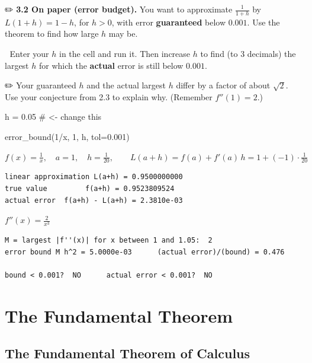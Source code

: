 \documentclass[
  letterpaper,
  DIV=11,
  numbers=noendperiod]{scrreprt}
\newenvironment{Shaded}{\begin{snugshade}}{\end{snugshade}}
\newcommand{\CommentTok}[1]{\textcolor[rgb]{0.37,0.37,0.37}{#1}}
\newcommand{\DecValTok}[1]{\textcolor[rgb]{0.68,0.00,0.00}{#1}}
\newcommand{\FloatTok}[1]{\textcolor[rgb]{0.68,0.00,0.00}{#1}}
\newcommand{\NormalTok}[1]{\textcolor[rgb]{0.00,0.23,0.31}{#1}}
\newcommand{\OperatorTok}[1]{\textcolor[rgb]{0.37,0.37,0.37}{#1}}
\theoremstyle{plain}
\theoremstyle{plain}
\theoremstyle{definition}
\theoremstyle{definition}
\theoremstyle{definition}
\theoremstyle{plain}
\theoremstyle{plain}
\theoremstyle{remark}
\begin{document}
✏️ \textbf{3.2 On paper (error budget).} You want to approximate
\(\frac{1}{1+h}\) by \(L(1+h) = 1-h\), for \(h>0\), with error
\textbf{guaranteed} below \(0.001\). Use the theorem to find how large
\(h\) may be.

🔬 Enter your \(h\) in the cell and run it. Then increase \(h\) to find
(to 3 decimals) the largest \(h\) for which the \textbf{actual} error is
still below \(0.001\).

✏️ Your guaranteed \(h\) and the actual largest \(h\) differ by a factor
of about \(\sqrt2\). Use your conjecture from 2.3 to explain why.
(Remember \(f''(1) = 2\).)

\begin{Shaded}
\begin{Highlighting}[]
\NormalTok{h }\OperatorTok{=} \FloatTok{0.05}          \CommentTok{\# \textless{}{-} change this}

\NormalTok{error\_bound(}\DecValTok{1}\OperatorTok{/}\NormalTok{x, }\DecValTok{1}\NormalTok{, h, tol}\OperatorTok{=}\FloatTok{0.001}\NormalTok{)}
\end{Highlighting}
\end{Shaded}

$\displaystyle f(x) = \frac{1}{x},\quad a = 1,\quad h = \frac{1}{20},\qquad L(a+h) = f(a) + f'(a)\,h = 1 + \left(-1\right)\cdot\frac{1}{20}$

\begin{verbatim}
linear approximation L(a+h) = 0.9500000000
true value         f(a+h) = 0.9523809524
actual error  f(a+h) - L(a+h) = 2.3810e-03
\end{verbatim}

$\displaystyle f''(x) = \frac{2}{x^{3}}$

\begin{verbatim}
M = largest |f''(x)| for x between 1 and 1.05:  2
error bound M h^2 = 5.0000e-03      (actual error)/(bound) = 0.476

bound < 0.001?  NO      actual error < 0.001?  NO
\end{verbatim}

\part{The Fundamental Theorem}

\chapter{The Fundamental Theorem of
Calculus}\label{the-fundamental-theorem-of-calculus}
\end{document}
